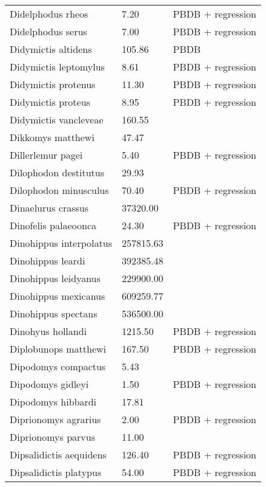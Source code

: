\documentclass{article}
\begin{document}
\begin{center}
\begin{longtable}{p{} p{} p{}}
    Didelphodus rheos & 7.20 & PBDB + regression \\ 
    Didelphodus serus & 7.00 & PBDB + regression \\ 
    Didymictis altidens & 105.86 & PBDB \\ 
    Didymictis leptomylus & 8.61 & PBDB + regression \\ 
    Didymictis protenus & 11.30 & PBDB + regression \\ 
    Didymictis proteus & 8.95 & PBDB + regression \\ 
    Didymictis vancleveae & 160.55 & \cite{Scott2004} \\ 
    Dikkomys matthewi & 47.47 & \cite{Tomiya2013} \\ 
    Dillerlemur pagei & 5.40 & PBDB + regression \\ 
    Dilophodon destitutus & 29.93 & \cite{Sinclair1915} \\ 
    Dilophodon minusculus & 70.40 & PBDB + regression \\ 
    Dinaelurus crassus & 37320.00 & \cite{McKenna2011} \\ 
    Dinofelis palaeoonca & 24.30 & PBDB + regression \\ 
    Dinohippus interpolatus & 257815.63 & \cite{Tomiya2013} \\ 
    Dinohippus leardi & 392385.48 & \cite{Tomiya2013} \\ 
    Dinohippus leidyanus & 229900.00 & \cite{MacFadden1986} \\ 
    Dinohippus mexicanus & 609259.77 & \cite{Tomiya2013} \\ 
    Dinohippus spectans & 536500.00 & \cite{McKenna2011} \\ 
    Dinohyus hollandi & 1215.50 & PBDB + regression \\ 
    Diplobunops matthewi & 167.50 & PBDB + regression \\ 
    Dipodomys compactus & 5.43 & \cite{Smith2004} \\ 
    Dipodomys gidleyi & 1.50 & PBDB + regression \\ 
    Dipodomys hibbardi & 17.81 & \cite{Tomiya2013} \\ 
    Diprionomys agrarius & 2.00 & PBDB + regression \\ 
    Diprionomys parvus & 11.00 & \cite{McKenna2011} \\ 
    Dipsalidictis aequidens & 126.40 & PBDB + regression \\ 
    Dipsalidictis platypus & 54.00 & PBDB + regression \\ 

\end{longtable}
\end{center}
\end{document}
